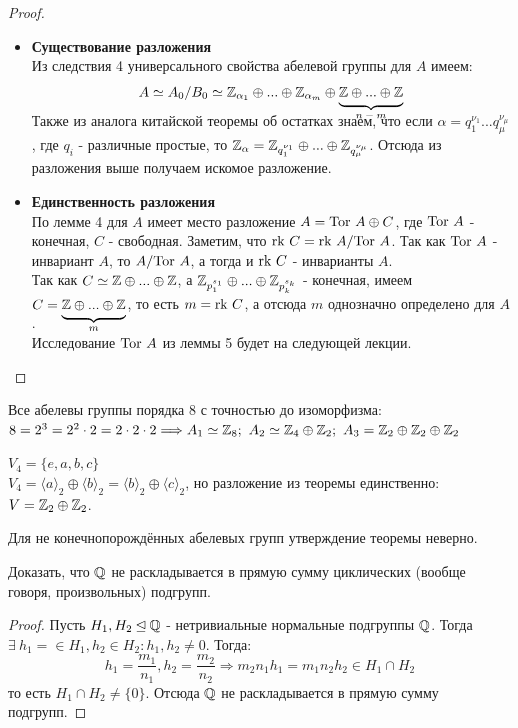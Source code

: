 \begin{proof}\tab
    \begin{itemize}
        \item \textbf{Существование разложения}\\
        Из следствия 4 универсального свойства абелевой группы для $A$ имеем:
        \[A \simeq A_0/B_0 \simeq \Z_{\alpha_1} \oplus ... \oplus \Z_{\alpha_m} \oplus \undermat{n-m}{\Z\oplus ... \oplus \Z}\]
        \newline
        Также из аналога китайской теоремы об остатках знаем, что если $\alpha = q_1^{\nu_1}...q_\mu^{\nu_\mu}$, где $q_i$ - различные простые, то $\mathbb{Z}_\alpha = \mathbb{Z}_{q_1^{\nu_1}} \oplus ... \oplus \mathbb{Z}_{q_\mu^{\nu_\mu}}$. Отсюда из разложения выше получаем искомое разложение.
        \item \textbf{Единственность разложения}\\
        По лемме 4 для $A$ имеет место разложение $A = \textup{Tor } A \oplus C$, где $\textup{Tor } A$ - конечная, $C$ - свободная. Заметим, что $\textup{rk } C = \textup{rk } A/\textup{Tor } A$. Так как $\textup{Tor } A$ - инвариант $A$, то $A/\textup{Tor } A$, а тогда и $\textup{rk } C$ - инварианты $A$.\\
        Так как $C \simeq \mathbb{Z} \oplus ... \oplus \mathbb{Z}$, а $\mathbb{Z}_{p_1^{s_1}} \oplus ... \oplus \mathbb{Z}_{p_k^{s_k}}$ - конечная, имеем $C = \undermat{m}{\Z \oplus ... \oplus \Z}$, то есть $m = \textup{rk } C$, а отсюда $m$ однозначно определено для $A$.\\
        Исследование $\textup{Tor }A$ из леммы 5 будет на следующей лекции.
    \end{itemize}
\end{proof}
\begin{example}
    Все абелевы группы порядка 8 с точностью до изоморфизма:\\
    $8 = 2^3 = 2^2 \cdot 2 = 2 \cdot 2 \cdot 2 \Longrightarrow A_1 \simeq \mathbb{Z}_8; \ A_2 \simeq \mathbb{Z}_4 \oplus \mathbb{Z}_2; \ A_3 = \mathbb{Z}_2 \oplus \mathbb{Z}_2 \oplus \mathbb{Z}_2$
\end{example}
\begin{example}
    $V_4 = \{e, a, b, c\}$\\
    $V_4 = \langle a \rangle_2 \oplus \langle b \rangle_2 = \langle b \rangle_2 \oplus \langle c \rangle_2$, но разложение из теоремы единственно: $V = \mathbb{Z}_2 \oplus \mathbb{Z}_2$.
\end{example}
\begin{remark}
    Для не конечнопорождённых абелевых групп утверждение теоремы неверно.
\end{remark}
\begin{exercise}
    Доказать, что $\mathbb{Q}$ не раскладывается в прямую сумму циклических (вообще говоря, произвольных) подгрупп.
\end{exercise}
\begin{proof}
    Пусть $H_1, H_2 \unlhd \mathbb{Q}$ - нетривиальные нормальные подгруппы $\mathbb{Q}$. Тогда $\exists \ h_1 = \in H_1, h_2 \in H_2: h_1, h_2 \neq 0$. Тогда:
    \[h_1 = \frac{m_1}{n_1}, h_2 = \frac{m_2}{n_2} \Longrightarrow m_2n_1h_1 = m_1n_2h_2 \in H_1 \cap H_2\]
    то есть $H_1 \cap H_2 \neq \{0\}$. Отсюда $\mathbb{Q}$ не раскладывается в прямую сумму подгрупп.
\end{proof}
